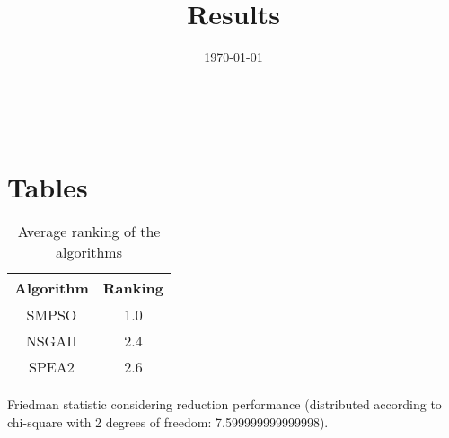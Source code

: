 \documentclass{article}
\title{Results}
\author{}
\date{\today}
\begin{document}
\oddsidemargin 0in \topmargin 0in\maketitle
\
\section{Tables}
\begin{table}[!htp]
\centering
\caption{Average ranking of the algorithms}
\begin{tabular}{c|c}
Algorithm&Ranking\\
\hline
SMPSO&1.0\\
NSGAII&2.4\\
SPEA2&2.6\\
\end{tabular}
\end{table}


Friedman statistic considering reduction performance (distributed according to chi-square with 2 degrees of freedom: 7.599999999999998).
\end{document}
